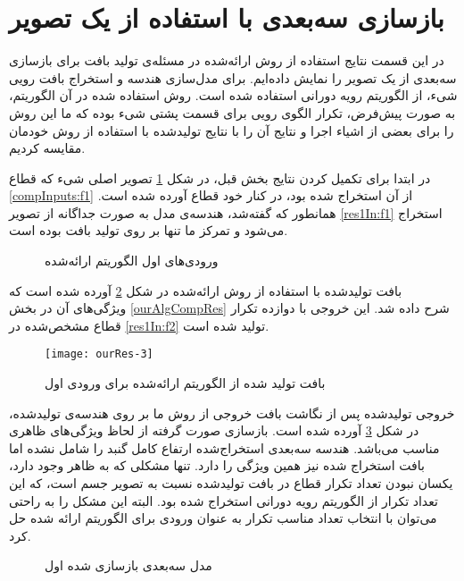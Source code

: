 \section{بازسازی سه‌بعدی با استفاده از یک تصویر}
در این قسمت نتایج استفاده از روش ارائه‌شده در مسئله‌ی تولید بافت برای بازسازی سه‌بعدی از یک تصویر را نمایش داده‌ایم. برای مدل‌سازی هندسه و استخراج بافت رویی شیء، از الگوریتم رویه دورانی استفاده شده است. روش استفاده شده در آن الگوریتم، به صورت پیش‌فرض، تکرار الگوی رویی برای قسمت پشتی شیء بوده که ما این روش را برای بعضی از اشیاء اجرا و نتایج آن را با نتایج تولید‌شده با استفاده از روش خودمان مقایسه کردیم.

در ابتدا برای تکمیل کردن نتایج بخش قبل، در شکل \ref{res1In} تصویر اصلی شیء که قطاع \ref{compInputs:f1} از آن استخراج شده بود، در کنار خود قطاع آورده شده است. همانطور که گفته‌شد، هندسه‌ی مدل به صورت جداگانه از تصویر \ref{res1In:f1} استخراج می‌شود و تمرکز ما تنها بر روی تولید بافت بوده است.
\begin{figure}[h!]
	\centering
	\qquad
	\caption{ورودی‌های اول الگوریتم ارائه‌شده}
	\label{res1In}
\end{figure}
\newline
بافت تولید‌شده با استفاده از روش ارائه‌شده در شکل \ref{res1Out} آورده شده است که ویژگی‌های آن در بخش \ref{ourAlgCompRes} شرح داده شد. این خروجی با دوازده تکرار قطاع مشخص‌شده در \ref{res1In:f2} تولید شده است.
\begin{figure}[h!]
	\centering
	\texttt{[image: ourRes-3]}
	\caption{بافت تولید شده از الگوریتم ارائه‌شده برای ورودی اول}
	\label{res1Out}
\end{figure}
\newline
خروجی تولید‌شده پس از نگاشت بافت خروجی از روش ما بر روی هندسه‌ی تولید‌شده، در شکل \ref{res1_3DOut} آورده شده است. بازسازی صورت گرفته از لحاظ ویژگی‌های ظاهری مناسب می‌باشد. هندسه سه‌بعدی استخراج‌شده ارتفاع کامل گنبد را شامل نشده اما بافت استخراج شده نیز همین ویژگی را دارد. تنها مشکلی که به ظاهر وجود دارد، یکسان نبودن تعداد تکرار قطاع در بافت تولید‌شده نسبت به تصویر جسم است، که این تعداد تکرار از الگوریتم رویه دورانی استخراج شده بود. البته این مشکل را به راحتی می‌توان با انتخاب تعداد مناسب تکرار به عنوان ورودی برای الگوریتم ارائه شده حل کرد.
\begin{figure}[h!]
	\centering
	\qquad
	\caption{مدل سه‌بعدی بازسازی شده اول}
	\label{res1_3DOut}
\end{figure}

